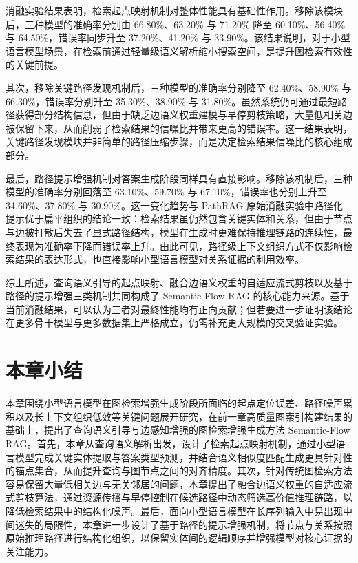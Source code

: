 \documentclass[promaster, vlined]{DissertUESTC}
\begin{document}
消融实验结果表明，检索起点映射机制对整体性能具有基础性作用。移除该模块后，三种模型的准确率分别由 66.80\%、63.20\% 与 71.20\% 降至 60.10\%、56.40\% 与 64.50\%，错误率同步升至 37.20\%、41.20\% 与 33.90\%。该结果说明，对于小型语言模型场景，在检索前通过轻量级语义解析缩小搜索空间，是提升图检索有效性的关键前提。

其次，移除关键路径发现机制后，三种模型的准确率分别降至 62.40\%、58.90\% 与 66.30\%，错误率分别升至 35.30\%、38.90\% 与 31.80\%。虽然系统仍可通过最短路径获得部分结构信息，但由于缺乏边语义权重建模与早停剪枝策略，大量低相关边被保留下来，从而削弱了检索结果的信噪比并带来更高的错误率。这一结果表明，关键路径发现模块并非简单的路径压缩步骤，而是决定检索结果信噪比的核心组成部分。

最后，路径提示增强机制对答案生成阶段同样具有直接影响。移除该机制后，三种模型的准确率分别回落至 63.10\%、59.70\% 与 67.10\%，错误率也分别上升至 34.60\%、37.80\% 与 30.90\%。这一变化趋势与 PathRAG 原始消融实验中路径化提示优于扁平组织的结论一致：检索结果虽仍然包含关键实体和关系，但由于节点与边被打散后失去了显式路径结构，模型在生成时更难保持推理链路的连续性，最终表现为准确率下降而错误率上升。由此可见，路径级上下文组织方式不仅影响检索结果的表达形式，也直接影响小型语言模型对关系证据的利用效率。

综上所述，查询语义引导的起点映射、融合边语义权重的自适应流式剪枝以及基于路径的提示增强三类机制共同构成了 Semantic-Flow RAG 的核心能力来源。基于当前消融结果，可以认为三者对最终性能均有正向贡献；但若要进一步证明该结论在更多骨干模型与更多数据集上严格成立，仍需补充更大规模的交叉验证实验。
\section{本章小结}
本章围绕小型语言模型在图检索增强生成阶段所面临的起点定位误差、路径噪声累积以及长上下文组织低效等关键问题展开研究，在前一章高质量图索引构建结果的基础上，提出了查询语义引导与边感知增强的图检索增强生成方法 Semantic-Flow RAG。首先，本章从查询语义解析出发，设计了检索起点映射机制，通过小型语言模型完成关键实体提取与答案类型预测，并结合语义相似度匹配生成更具针对性的锚点集合，从而提升查询与图节点之间的对齐精度。其次，针对传统图检索方法容易保留大量低相关边与无关邻居的问题，本章提出了融合边语义权重的自适应流式剪枝算法，通过资源传播与早停控制在候选路径中动态筛选高价值推理链路，以降低检索结果中的结构化噪声。最后，面向小型语言模型在长序列输入中易出现中间迷失的局限性，本章进一步设计了基于路径的提示增强机制，将节点与关系按照原始推理路径进行结构化组织，以保留实体间的逻辑顺序并增强模型对核心证据的关注能力。
\end{document}

